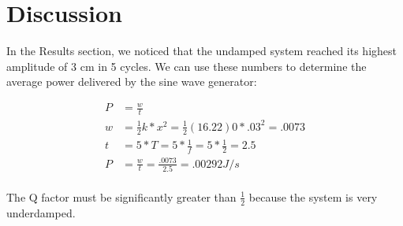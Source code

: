 \documentclass[]{article}
\begin{document}
\section{Discussion}

In the Results section, we noticed that the undamped system reached its highest amplitude of 3 cm in 5 cycles. We can use these numbers to determine the average power delivered by the sine wave generator:

\begin{equation}
\begin{split}
	P&=\frac{w}{t}\\
	w&=\frac{1}{2}k*x^2	=\frac{1}{2}(16.22)0*.03^2	=.0073\\
	t&=5*T =5*\frac{1}{f} =5*\frac{1}{2} =2.5\\
	P&=\frac{w}{t} =\frac{.0073}{2.5} =.00292 J/s\\
\end{split}
\end{equation}

The Q factor must be significantly greater than $\frac{1}{2}$ because the system is very underdamped.
\end{document}
